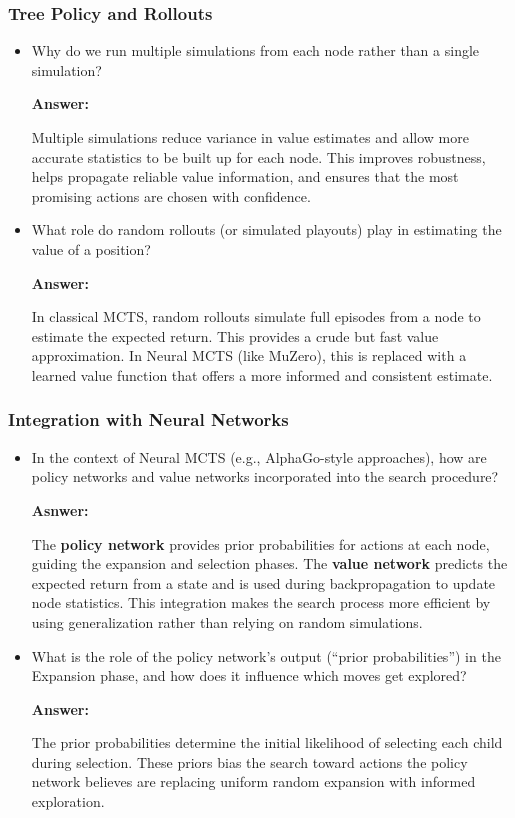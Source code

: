 \subsubsection{Tree Policy and Rollouts}
\begin{itemize} 
   \item Why do we run multiple simulations from each node rather than a single simulation?  

   \textbf{Answer:}

   Multiple simulations reduce variance in value estimates and allow more accurate statistics to be built up for each node. This improves robustness, helps propagate reliable value information, and ensures that the most promising actions are chosen with confidence.

   \item What role do random rollouts (or simulated playouts) play in estimating the value of a position?

   \textbf{Answer:}

   In classical MCTS, random rollouts simulate full episodes from a node to estimate the expected return. This provides a crude but fast value approximation. In Neural MCTS (like MuZero), this is replaced with a learned value function that offers a more informed and consistent estimate.

\end{itemize}


\subsubsection{Integration with Neural Networks}
\begin{itemize}
    \item In the context of Neural MCTS (e.g., AlphaGo-style approaches), how are policy networks and value networks incorporated into the search procedure? 

    \textbf{Asnwer:}

    The \textbf{policy network} provides prior probabilities for actions at each node, guiding the expansion and selection phases. The \textbf{value network} predicts the expected return from a state and is used during backpropagation to update node statistics. This integration makes the search process more efficient by using generalization rather than relying on random simulations.

    \item What is the role of the policy network’s output (“prior probabilities”) in the Expansion phase, and how does it influence which moves get explored?

    \textbf{Answer:}

    The prior probabilities determine the initial likelihood of selecting each child during selection. These priors bias the search toward actions the policy network believes are replacing uniform random expansion with informed exploration.

\end{itemize}


